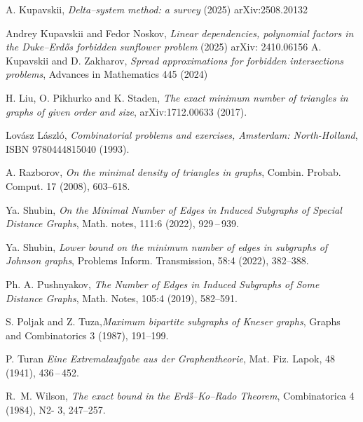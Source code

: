 \documentclass[12pt,a4paper]{article}
\begin{document}
\begin{thebibliography}{}
 A. Kupavskii, {\it Delta--system method: a survey} (2025) arXiv:2508.20132

 Andrey Kupavskii and Fedor Noskov, {\it Linear dependencies, polynomial factors in
the Duke--Erd\H os forbidden sunflower problem} (2025) arXiv: 2410.06156
 A. Kupavskii and D. Zakharov, {\it Spread approximations for forbidden
intersections problems}, Advances in Mathematics 445 (2024)


  H. Liu, O. Pikhurko and K. Staden, {\it The exact minimum number of triangles in graphs of given
order and size}, arXiv:1712.00633 (2017).

 Lov\'asz L\'aszl\'o, {\it Combinatorial problems and exercises, Amsterdam: North-Holland}, ISBN 9780444815040 (1993).

  A. Razborov, {\it On the minimal density of triangles in graphs}, Combin. Probab. Comput. 17 (2008),
603--618.

 Ya. Shubin, 
    \textit{On the Minimal Number of Edges in Induced Subgraphs of Special Distance Graphs}, 
    Math. notes, 111:6 (2022), 929\,--\,939.

     Ya. Shubin, 
    \textit{Lower bound on the minimum number of edges in subgraphs of Johnson graphs}, 
    Problems Inform. Transmission, 58:4 (2022), 382--388.

 Ph. A. Pushnyakov, 
    \textit{The Number of Edges in Induced Subgraphs of Some Distance Graphs}, 
    Math. Notes, 105:4 (2019), 582--591.

 S. Poljak and Z. Tuza,{\it Maximum bipartite subgraphs of Kneser graphs}, Graphs
and Combinatorics 3 (1987), 191–199.

 P. Turan
    \textit{Eine Extremalaufgabe aus der Graphentheorie},
    Mat. Fiz. Lapok, 48 (1941), 436\,--\,452.

 R.~M. Wilson, {\it The exact bound in the Erd\H s--Ko--Rado Theorem}, Combinatorica 4 (1984), N2-
3, 247--257.



\end{thebibliography}
\end{document}
